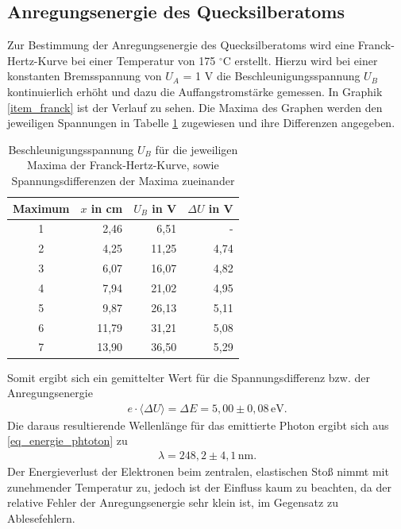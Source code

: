 \subsection{Anregungsenergie des Quecksilberatoms}
\label{sec_anregung}
Zur Bestimmung der Anregungsenergie des Quecksilberatoms wird eine Franck-Hertz-Kurve bei einer Temperatur von 175 $^{\circ}$C erstellt.
Hierzu wird bei einer konstanten Bremsspannung von $U_A$ = 1 V die Beschleunigungsspannung $U_B$ kontinuierlich erhöht und dazu die
Auffangstromstärke gemessen. In Graphik \ref{item_franck} ist der Verlauf zu sehen. Die Maxima des Graphen werden den jeweiligen Spannungen in
Tabelle \ref{tab_franck} zugewiesen und ihre Differenzen angegeben. 
\begin{table}[H]
 \begin{tabular}{c|r|r|r}
Maximum& $x$ in cm &	$U_B$ in V&	$\Delta U$ in V\\
\hline
1& 	2,46& 	6,51& -	\\
2& 	4,25	& 11,25&	4,74 \\
3& 	6,07&	16,07&	4,82\\
4& 	7,94&	21,02&	4,95\\
5& 	9,87&	26,13&	5,11\\
6& 	11,79&  31,21&	5,08\\
7& 	13,90& 	36,50&	5,29
 \end{tabular}
\caption{Beschleunigungsspannung $U_B$ für die jeweiligen Maxima der Franck-Hertz-Kurve, sowie Spannungsdifferenzen der Maxima zueinander}
\label{tab_franck}
\end{table}
Somit ergibt sich ein gemittelter Wert für die Spannungsdifferenz bzw. der Anregungsenergie
\begin{align}
 e \cdot \langle \Delta U \rangle= \Delta E = 5,00 \pm 0,08 \, \text{eV}.
\end{align}
Die daraus resultierende Wellenlänge für das emittierte Photon ergibt sich aus \eqref{eq_energie_phtoton} zu
\begin{align}
 \lambda = 248,2 \pm 4,1 \, \text{nm}.
\end{align}
Der Energieverlust der Elektronen beim zentralen, elastischen Stoß nimmt mit zunehmender Temperatur zu, jedoch ist der Einfluss kaum
zu beachten, da der relative Fehler der Anregungsenergie sehr klein ist, im Gegensatz zu Ablesefehlern.

